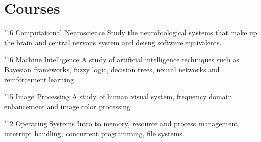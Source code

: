 \documentclass{tccv}
\begin{document}
\section{Courses}

\begin{yearlist}

\item{'16} {Computational Neuroscience} {Study the neurobiological systems that
    make up the brain and central nervous system and deisng software
    equivalents.}

\item{'16} {Machine Intelligence} {A study of artificial intelligence techniques
    such as Bayesian frameworks, fuzzy logic, decision trees, neural networks
    and reinforcement learning}

\item{'15}
  {Image Processing}
  {A study of human visual system, frequency domain enhancement and image color processing}
\item{'12} {Operating Systems} {Intro to memory, resource and process
    management, interrupt handling, concurrent programming, file systems.}



\end{yearlist}


\end{document}
